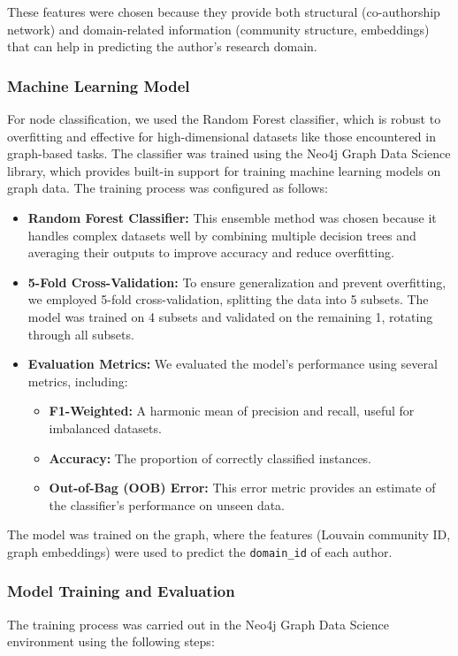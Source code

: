 \documentclass[conference, 12pt]{IEEEtran}
\begin{document}
These features were chosen because they provide both structural (co-authorship network) and domain-related information (community structure, embeddings) that can help in predicting the author's research domain.

\subsubsection{Machine Learning Model}
For node classification, we used the Random Forest classifier, which is robust to overfitting and effective for high-dimensional datasets like those encountered in graph-based tasks. The classifier was trained using the Neo4j Graph Data Science library, which provides built-in support for training machine learning models on graph data. The training process was configured as follows:

\begin{itemize}
  \item \textbf{Random Forest Classifier:} This ensemble method was chosen because it handles complex datasets well by combining multiple decision trees and averaging their outputs to improve accuracy and reduce overfitting.
  \item \textbf{5-Fold Cross-Validation:} To ensure generalization and prevent overfitting, we employed 5-fold cross-validation, splitting the data into 5 subsets. The model was trained on 4 subsets and validated on the remaining 1, rotating through all subsets.
  \item \textbf{Evaluation Metrics:} We evaluated the model's performance using several metrics, including:
    \begin{itemize}
      \item \textbf{F1-Weighted:} A harmonic mean of precision and recall, useful for imbalanced datasets.
      \item \textbf{Accuracy:} The proportion of correctly classified instances.
      \item \textbf{Out-of-Bag (OOB) Error:} This error metric provides an estimate of the classifier’s performance on unseen data.
    \end{itemize}
\end{itemize}

The model was trained on the graph, where the features (Louvain community ID, graph embeddings) were used to predict the \texttt{domain\_id} of each author.

\subsubsection{Model Training and Evaluation}
The training process was carried out in the Neo4j Graph Data Science environment using the following steps:
\end{document}
